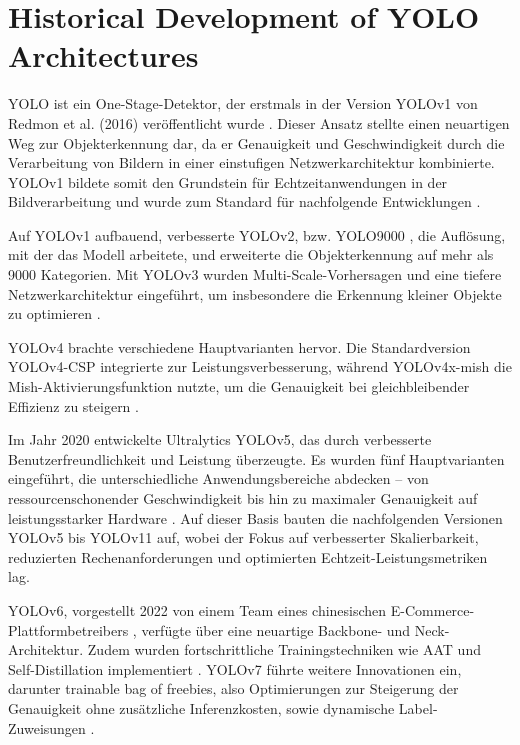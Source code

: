 \section{Historical Development of YOLO Architectures}

\acrfull{YOLO} ist ein One-Stage-Detektor, der erstmals in der Version YOLOv1 von Redmon et al. (2016) veröffentlicht wurde \cite{redmon2016}. Dieser Ansatz stellte einen neuartigen Weg zur Objekterkennung dar, da er Genauigkeit und Geschwindigkeit durch die Verarbeitung von Bildern in einer einstufigen Netzwerkarchitektur kombinierte. YOLOv1 bildete somit den Grundstein für Echtzeitanwendungen in der Bildverarbeitung und wurde zum Standard für nachfolgende Entwicklungen \cite{Sapkota2025}.

Auf YOLOv1 aufbauend, verbesserte YOLOv2, bzw. YOLO9000 \cite{Li2018,Nakahara2018}, die Auflösung, mit der das Modell arbeitete, und erweiterte die Objekterkennung auf mehr als 9000 Kategorien. Mit YOLOv3 wurden Multi-Scale-Vorhersagen und eine tiefere Netzwerkarchitektur eingeführt, um insbesondere die Erkennung kleiner Objekte zu optimieren \cite{Kim2018}.

YOLOv4 brachte verschiedene Hauptvarianten hervor. Die Standardversion YOLOv4-CSP integrierte  zur Leistungsverbesserung, während YOLOv4x-mish die Mish-Aktivierungsfunktion nutzte, um die Genauigkeit bei gleichbleibender Effizienz zu steigern \cite{Nepal2022,Sozzi2022,Mohod2023}. 

Im Jahr 2020 entwickelte Ultralytics YOLOv5, das durch verbesserte Benutzerfreundlichkeit und Leistung überzeugte. Es wurden fünf Hauptvarianten eingeführt, die unterschiedliche Anwendungsbereiche abdecken – von ressourcenschonender Geschwindigkeit bis hin zu maximaler Genauigkeit auf leistungsstarker Hardware \cite{Sapkota2025,ultralyics_2020}. Auf dieser Basis bauten die nachfolgenden Versionen YOLOv5 bis YOLOv11 auf, wobei der Fokus auf verbesserter Skalierbarkeit, reduzierten Rechenanforderungen und optimierten Echtzeit-Leistungsmetriken lag.

YOLOv6, vorgestellt 2022 von einem Team eines chinesischen E-Commerce-Plattformbetreibers \cite{li2022}, verfügte über eine neuartige Backbone- und Neck-Architektur. Zudem wurden fortschrittliche Trainingstechniken wie \acrfull{AAT} und Self-Distillation implementiert \cite{Sapkota2025,li2022}. YOLOv7 \cite{wang2022,Wang2023} führte weitere Innovationen ein, darunter trainable bag of freebies, also Optimierungen zur Steigerung der Genauigkeit ohne zusätzliche Inferenzkosten, sowie dynamische Label-Zuweisungen \cite{wang2022,Wang2023,Sapkota2025}.

